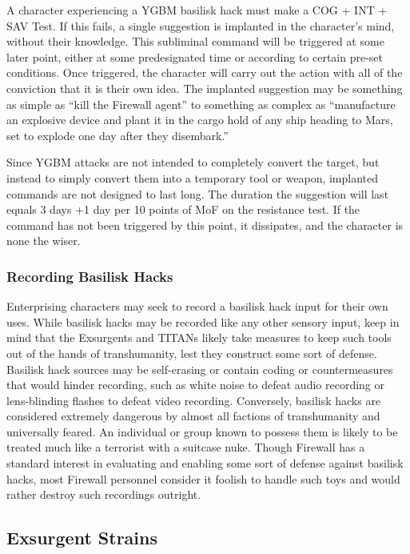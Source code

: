 A character experiencing a YGBM basilisk hack 
must make a COG + INT + SAV Test. If this fails, a 
single suggestion is implanted in the character's mind, 
without their knowledge. This subliminal command 
will be triggered at some later point, either at some 
predesignated time or according to certain pre-set 
conditions. Once triggered, the character will carry 
out the action with all of the conviction that it is their 
own idea. The implanted suggestion may be something 
as simple as ``kill the Firewall agent'' to something as 
complex as ``manufacture an explosive device and 
plant it in the cargo hold of any ship heading to Mars, 
set to explode one day after they disembark.''

Since YGBM attacks are not intended to completely 
convert the target, but instead to simply convert them 
into a temporary tool or weapon, implanted commands
are not designed to last long. The duration
the suggestion will last equals 3 days +1 day per 10 
points of MoF on the resistance test. If the command 
has not been triggered by this point, it dissipates, and 
the character is none the wiser.

\subsubsection{Recording Basilisk Hacks}

Enterprising characters may seek to record a basilisk 
hack input for their own uses. While basilisk hacks may 
be recorded like any other sensory input, keep in mind 
that the Exsurgents and TITANs likely take measures 
to keep such tools out of the hands of transhumanity, 
lest they construct some sort of defense. Basilisk hack 
sources may be self-erasing or contain coding or countermeasures
that would hinder recording, such as white
noise to defeat audio recording or lens-blinding flashes 
to defeat video recording. Conversely, basilisk hacks are 
considered extremely dangerous by almost all factions 
of transhumanity and universally feared. An individual 
or group known to possess them is likely to be treated 
much like a terrorist with a suitcase nuke. Though 
Firewall has a standard interest in evaluating and enabling
some sort of defense against basilisk hacks, most
Firewall personnel consider it foolish to handle such 
toys and would rather destroy such recordings outright.

\subsection{Exsurgent Strains}

